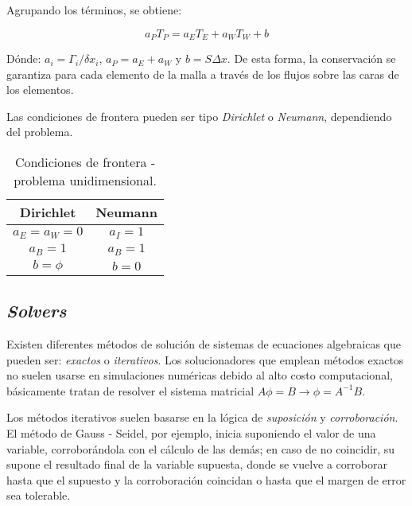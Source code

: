 \noindent
\justify

Agrupando los t\'erminos, se obtiene:

\begin{equation}
a_P T_P = a_E T_E + a_W T_W + b
\label{General1D}
\end{equation}

\noindent
\justify

D\'onde: $a_i = \Gamma _i / \delta x_i$, $a_P = a_E + a_W$ y $b = S \Delta x$. De esta forma, la conservaci\'on se garantiza para cada elemento de la malla a trav\'es de los flujos sobre las caras de los elementos.

\noindent
\justify

Las condiciones de frontera pueden ser tipo \textit{Dirichlet} o \textit{Neumann}, dependiendo del problema.

\begin{table}[h!]
\centering
\begin{tabular}{c|c}
\hline
\textbf{Dirichlet} & \textbf{Neumann} \\ \hline
$a_E = a_W = 0$ & $a_I = 1$ \\
$a_B = 1$ & $a_B = 1$ \\
$b = \phi$ & $b = 0$ \\ \hline
\end{tabular}
\caption{Condiciones de frontera - problema unidimensional.}
\end{table}

\subsection{\textit{Solvers}}

\noindent
\justify

Existen diferentes m\'etodos de soluci\'on de sistemas de ecuaciones algebraicas que pueden ser: \textit{exactos} o \textit{iterativos}. Los solucionadores que emplean m\'etodos exactos no suelen usarse en simulaciones num\'ericas debido al alto costo computacional, b\'asicamente tratan de resolver el sistema matricial $A \phi = B \rightarrow \phi = A^{-1} B$. 

\noindent
\justify

Los m\'etodos iterativos suelen basarse en la l\'ogica de \textit{suposici\'on} y \textit{corroboraci\'on}. El m\'etodo de Gauss - Seidel, por ejemplo, inicia suponiendo el valor de una variable, corrobor\'andola con el c\'alculo de las dem\'as; en caso de no coincidir, su supone el resultado final de la variable supuesta, donde se vuelve a corroborar hasta que el supuesto y la corroboraci\'on coincidan o hasta que el margen de error sea tolerable.

